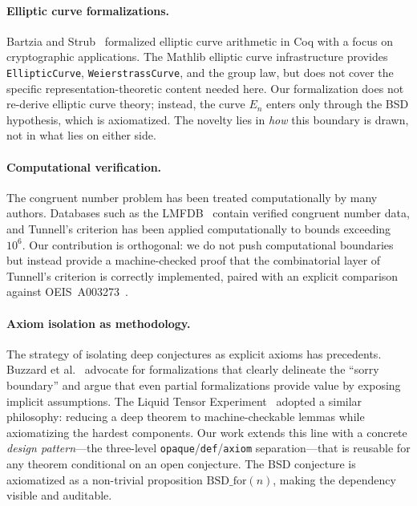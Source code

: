 \documentclass[11pt,a4paper]{article}
\theoremstyle{definition}
\newcommand{\lean}[1]{\texttt{#1}}
\newcommand{\BSDfor}{\mathrm{BSD\_for}}
\begin{document}
\paragraph{Elliptic curve formalizations.}
Bartzia and Strub~\cite{BartziaStrub2014} formalized elliptic curve
arithmetic in Coq with a focus on cryptographic applications.
The Mathlib elliptic curve infrastructure provides \lean{EllipticCurve},
\lean{WeierstrassCurve}, and the group law, but does not cover
the specific representation-theoretic content needed here.
Our formalization does not re-derive elliptic curve theory; instead,
the curve $E_n$ enters only through the BSD hypothesis, which is
axiomatized.  The novelty lies in \emph{how} this boundary is drawn,
not in what lies on either side.

\paragraph{Computational verification.}
The congruent number problem has been treated computationally by many
authors.  Databases such as the LMFDB~\cite{LMFDB2024} contain
verified congruent number data, and Tunnell's criterion has been
applied computationally to bounds exceeding~$10^6$.  Our contribution is orthogonal: we do not push
computational boundaries but instead provide a machine-checked proof
that the combinatorial layer of Tunnell's criterion is correctly
implemented, paired with an explicit comparison against
OEIS~A003273~\cite{OEIS_A003273}.

\paragraph{Axiom isolation as methodology.}
The strategy of isolating deep conjectures as explicit axioms has
precedents.  Buzzard et al.~\cite{BuzzardEtAl2020} advocate for
formalizations that clearly delineate the ``sorry boundary'' and
argue that even partial formalizations provide value by exposing
implicit assumptions.  The Liquid Tensor Experiment~\cite{Scholze2022}
adopted a similar philosophy: reducing a deep theorem to
machine-checkable lemmas while axiomatizing the hardest components.
Our work extends this line with a concrete \emph{design pattern}---the
three-level \lean{opaque}/\lean{def}/\lean{axiom} separation---that
is reusable for any theorem conditional on an open conjecture.
The BSD conjecture is axiomatized as a non-trivial proposition
$\BSDfor(n)$, making the dependency visible and auditable.

\end{document}
